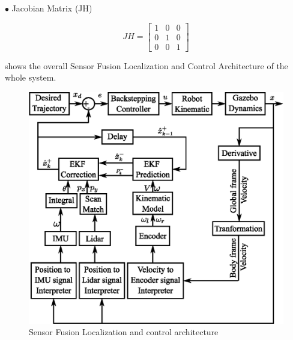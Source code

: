 $\bullet$ Jacobian Matrix (JH)\par
\begin{equation}
JH = \begin{bmatrix}
1 & 0 & 0\\
0 & 1 & 0\\
0 & 0 & 1
\end{bmatrix}
\end{equation}



\break
\textbf{\figureautorefname{ \ref{fig:Sensor Fusion Localization and control architecture}}} shows the overall Sensor Fusion Localization and Control Architecture of the whole system.
\begin{figure}[ht]
	\centering
	\includegraphics[scale=1]{images/imagess/5cont-propose_arch.eps} 
	\caption{Sensor Fusion Localization and control architecture}
	\label{fig:Sensor Fusion Localization and control architecture}
\end{figure}

